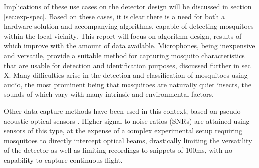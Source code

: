         Implications of these use cases on the detector design will be discussed in section \ref{sec:exp-spec}. Based on these cases, it is clear there is a need for both a hardware solution and accompanying algorithms, capable of detecting mosquitoes within the local vicinity. This report will focus on algorithm design, results of which improve with the amount of data available. Microphones, being inexpensive and versatile, provide a suitable method for capturing mosquito characteristics that are usable for detection and identification purposes, discussed further in sec X. Many difficulties arise in the detection and classification of mosquitoes using audio, the most prominent being that mosquitoes are naturally quiet insects, the sounds of which vary with many intrinsic and environmental factors.
        
        Other data-capture methods have been used in this context, based on pseudo-acoustic optical sensors \cite{Chen2014}. Higher signal-to-noise ratios (SNRs) are attained using sensors of this type, at the expense of a complex experimental setup requiring mosquitoes to directly intercept optical beams, drastically limiting the versatility of the detector as well as limiting recordings to snippets of 100ms, with no capability to capture continuous flight. 
        
        
        
        
  

